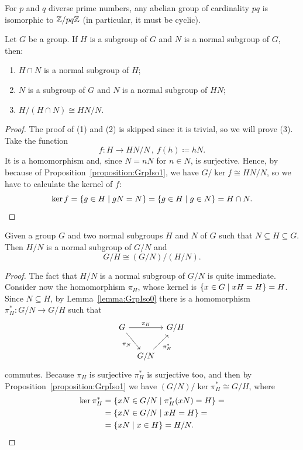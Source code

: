 \begin{exercise}
For \(p\) and \(q\) diverse prime numbers, any abelian group of cardinality \(pq\) is isomorphic to \(\mathbb Z/pq\mathbb Z\) (in particular, it must be cyclic).
\end{exercise}

\begin{proposition}
Let \(G\) be a group. If \(H\) is a subgroup of \(G\) and \(N\) is a normal subgroup of \(G\), then:
\begin{enumerate}
\item \(H \cap N\) is a normal subgroup of \(H\);
\item \(N\) is a subgroup of \(G\) and \(N\) is a normal subgroup of \(HN\);
\item \(H/(H \cap N) \cong HN/N\).
\end{enumerate}
\end{proposition}

\begin{proof}
The proof of (1) and (2) is skipped since it is trivial, so we will prove (3). Take the function
\[f : H \to HN/N\,, \ f(h) \coloneq hN .\]
It is a homomorphism and, since \(N = nN\) for \(n \in N\), is surjective.
Hence, by because of Proposition~\ref{proposition:GrpIso1}, we have \(G/\ker f \cong HN/N\), so we have to calculate the kernel of \(f\):
\[\ker f = \left\{g \in H \mid gN = N\right\} = \left\{g \in H \mid g \in N\right\} = H \cap N .\qedhere\]
\end{proof}

\begin{proposition}
Given a group \(G\) and two normal subgroups \(H\) and \(N\) of \(G\) such that \(N \subseteq H \subseteq G\). Then \(H/N\) is a normal subgroup of \(G/N\) and
\[G/H \cong (G/N)/(H/N) .\]
\end{proposition}

\begin{proof}
The fact that \(H/N\) is a normal subgroup of \(G/N\) is quite immediate. Consider now the homomorphism \(\pi_H\), whose kernel is \(\left\{x \in G \mid xH = H\right\} = H\). Since \(N \subseteq H\), by Lemma~\ref{lemma:GrpIso0} there is a homomorphism \(\pi_H^\ast : G/N \to G/H\) such that
\[\begin{tikzcd}[column sep=tiny]
G \ar["{\pi_H}", rr] \ar["\pi_N", swap, dr] & & G/H \\
& G/N \ar["{\pi_H^\ast}", swap, ur]
\end{tikzcd}\]
commutes. Because \(\pi_H\) is surjective \(\pi_H^\ast\) is surjective too, and then by Proposition~\ref{proposition:GrpIso1} we have \((G/N)/\ker \pi_H^\ast \cong G/H\), where
\begin{align*}
\ker \pi_H^\ast &= \left\{xN \in G/N \mid \pi_H^\ast(xN) = H\right\} = \\
                &= \left\{xN \in G/N \mid xH = H\right\} = \\
                &= \left\{xN \mid x \in H\right\} = H/N .\qedhere
\end{align*}
\end{proof}

